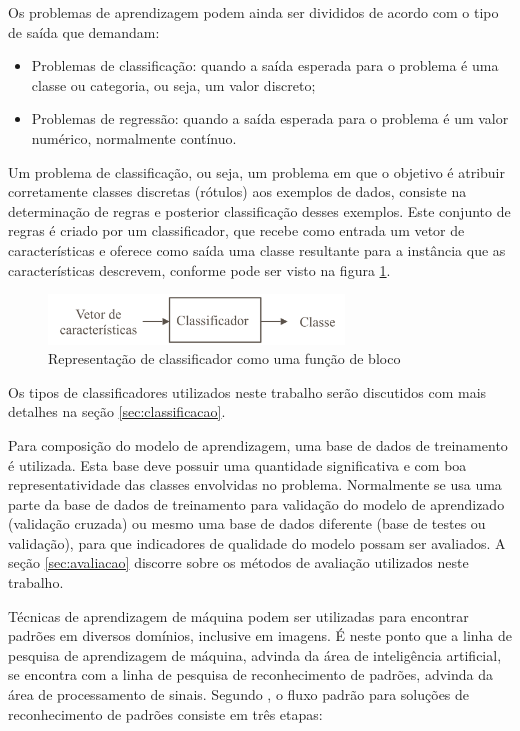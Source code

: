 Os problemas de aprendizagem podem ainda ser divididos de acordo com o tipo de saída que demandam:

\begin{itemize}
	\item Problemas de classificação: quando a saída esperada para o problema é uma classe ou categoria, ou seja, um valor discreto;
	\item Problemas de regressão: quando a saída esperada para o problema é um valor numérico, normalmente contínuo.
\end{itemize}

Um problema de classificação, ou seja, um problema em que o objetivo é atribuir corretamente classes discretas (rótulos) aos exemplos de dados, consiste na determinação de regras e posterior classificação desses exemplos. Este conjunto de regras é criado por um classificador, que recebe como entrada um vetor de características e oferece como saída uma classe resultante para a instância que as características descrevem, conforme pode ser visto na figura \ref{fig:classificador}.

\begin{figure}[h!]
  \centering
  \includegraphics[width=0.7\textwidth]{imgs/classificador}
  \caption{Representação de classificador como uma função de bloco}
  \label{fig:classificador}
\end{figure}

Os tipos de classificadores utilizados neste trabalho serão discutidos com mais detalhes na seção \ref{sec:classificacao}.

Para composição do modelo de aprendizagem, uma base de dados de treinamento é utilizada. Esta base deve possuir uma quantidade significativa e com boa representatividade das classes envolvidas no problema. Normalmente se usa uma parte da base de dados de treinamento para validação do modelo de aprendizado (validação cruzada) ou mesmo uma base de dados diferente (base de testes ou validação), para que indicadores de qualidade do modelo possam ser avaliados. A seção \ref{sec:avaliacao} discorre sobre os métodos de avaliação utilizados neste trabalho.

Técnicas de aprendizagem de máquina podem ser utilizadas para encontrar padrões em diversos domínios, inclusive em imagens. É neste ponto que a linha de pesquisa de aprendizagem de máquina, advinda da área de inteligência artificial, se encontra com a linha de pesquisa de reconhecimento de padrões, advinda da área de processamento de sinais. Segundo , o fluxo padrão para soluções de reconhecimento de padrões consiste em três etapas:

